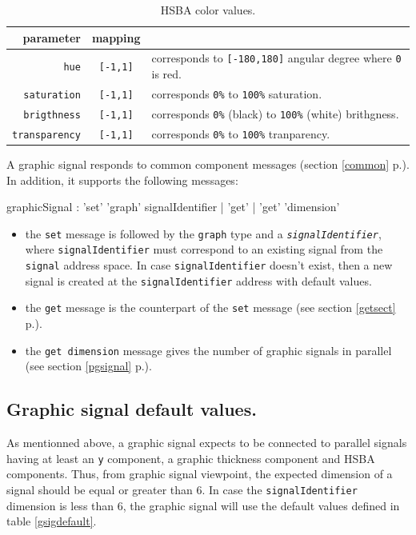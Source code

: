 \documentclass[a4paper,twoside]{report}
\newcommand{\subsublevel}[1]	{\subsection{#1}}
\newcommand{\fullref}[1]	{\ref{#1} p.\pageref{#1}}
\newcommand{\OSC}[1]		{\texttt{#1}}
\newcommand{\values}[1]	{\texttt{#1}}
\begin{document}
\begin{table}[htdp]
\caption{HSBA color values.}
\begin{center}
\begin{tabular}{|r|cl|}
\hline
parameter & mapping & \\
\hline
\OSC{hue}				& \OSC{[-1,1]} & corresponds to \OSC{[-180,180]} angular degree where \OSC{0} is red. \\
\OSC{saturation}		& \OSC{[-1,1]} & corresponds \OSC{0\%} to \OSC{100\%} saturation. \\
\OSC{brigthness}		& \OSC{[-1,1]} & corresponds \OSC{0\%} (black) to \OSC{100\%} (white) brithgness. \\
\OSC{transparency}		& \OSC{[-1,1]} & corresponds \OSC{0\%} to \OSC{100\%} tranparency. \\
\hline
\end{tabular}
\end{center}
\label{hsbamap}
\end{table}



A graphic signal responds to common component messages (section \fullref{common}). In addition, it supports the following messages:
\begin{rail}
graphicSignal : 'set' 'graph' signalIdentifier 
			| 'get'
			| 'get' 'dimension'
\end{rail}

\begin{itemize}
\item the \OSC{set} message is followed by the \OSC{graph} type and a \OSC{\textit{signalIdentifier}}, where \OSC{signalIdentifier} must correspond to an existing signal from the \OSC{signal} address space. In case \OSC{signalIdentifier} doesn't exist, then a new signal is created at the \OSC{signalIdentifier} address with default values. 
\item the \OSC{get} message is the counterpart of the \OSC{set} message (see section \fullref{getsect}). 
\item the \OSC{get dimension} message gives the number of graphic signals in parallel (see section \fullref{pgsignal}). 
 \end{itemize}

\subsublevel{Graphic signal default values.}
As mentionned above, a graphic signal expects to be connected to parallel signals having at least an \values{y} component, a graphic thickness component and HSBA components. Thus, from graphic signal viewpoint, the expected dimension of a signal should be equal or greater than 6. In case the \OSC{signalIdentifier} dimension is less than 6, the graphic signal will use the default values defined in table \ref{gsigdefault}.
\end{document}

